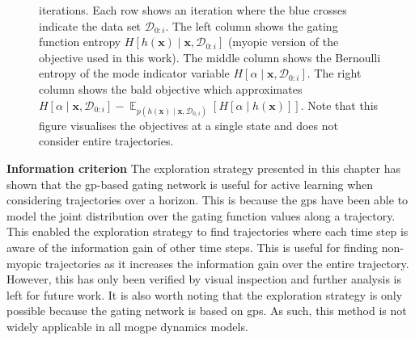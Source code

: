 \documentclass{mimosis-class/mimosis}
\numberwithin{equation}{chapter}
\DeclareMathOperator{\E}{\mathbb{E}}
\newcommand{\state}{\ensuremath{\mathbf{x}}}
\newcommand{\dataset}{\ensuremath{\mathcal{D}}}
\newcommand{\modeVar}{\ensuremath{\alpha}}
\newcommand{\gatingFunc}{\ensuremath{h}}
\begin{document}
{\begin{figure}
{iterations.
Each row shows an iteration where the blue crosses indicate the data set $\dataset_{0:i}$.
The left column shows the gating function entropy
$H[\gatingFunc(\state) \mid \state, \dataset_{0:i}]$ (myopic version of the objective used in this work).
The middle column shows the Bernoulli entropy of the mode indicator variable $H[\modeVar \mid \state, \dataset_{0:i}]$.
The right column shows the \acrfull{bald} objective which approximates
$H[\modeVar \mid \state, \dataset_{0:i}] - \E_{p(\gatingFunc(\state) \mid \state , \dataset_{0,i})}\left[ H \left[\modeVar \mid \gatingFunc(\state) \right] \right]$.
Note that this figure visualises the objectives at a single state and does not consider entire trajectories.}
\label{fig-explorative-traj-opt-entropy-comparison-7-2-7}
\end{figure}
\newline
\textbf{Information criterion}
The exploration strategy presented in this chapter has shown that the \acrshort{gp}-based gating network
is useful for active learning when considering trajectories over a horizon.
This is because the \acrshort{gps} have been able to  model the joint distribution over the
gating function values along a trajectory.
This enabled the exploration strategy to find trajectories where each time step is aware of the information gain
of other time steps.
This is useful for finding non-myopic trajectories as it increases the information gain over the entire trajectory.
However, this has only been verified by visual inspection and further analysis is left for future work.
It is also worth noting that the exploration strategy is only possible because the gating
network is based on \acrshort{gps}.
As such, this method is not widely applicable in all \acrshort{mogpe} dynamics models.

}
\end{document}
